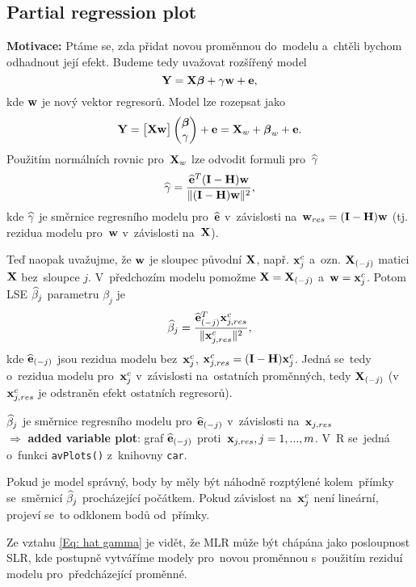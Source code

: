 \subsection{Partial regression plot}
	\textbf{Motivace:} Ptáme se, zda přidat novou proměnnou do~modelu a~chtěli bychom odhadnout její efekt. Budeme tedy uvažovat rozšířený model
	 $$
	\mathbf{Y} = \mathbf{X} \boldsymbol{\beta} + \gamma \mathbf{w} + \mathbf{e},
	 $$
	kde $\mathbf{w}$ je nový vektor regresorů. Model lze rozepsat jako
	 $$
	\mathbf{Y} = \begin{bmatrix}
	\mathbf{X} \mathbf{w}
	\end{bmatrix} \begin{pmatrix}
	\boldsymbol{\beta} \\ \gamma
	\end{pmatrix} + \mathbf{e} = \mathbf{X}_w + \boldsymbol{\beta}_w + \mathbf{e}.
	 $$
	Použitím normálních rovnic pro~$\mathbf{X}_w$ lze odvodit formuli pro~$\widehat{\gamma}$
	\begin{equation}
		\widehat{\gamma} = \frac{\widehat{\mathbf{e}}^T (\textbf{I} - \textbf{H}) \mathbf{w}}{\| (\textbf{I} - \textbf{H})\mathbf{w} \|^2},
		\label{Eq: hat gamma}
	\end{equation}
	kde $\widehat{\gamma}$ je směrnice regresního modelu pro~$\widehat{\mathbf{e}}$ v~závislosti na~$\mathbf{w}_{res} = (\textbf{I} - \textbf{H})\mathbf{w}$ (tj. rezidua modelu pro~$\mathbf{w}$ v~závislosti na~$\mathbf{X}$).
	
	Teď naopak uvažujme, že $\mathbf{w}$ je sloupec původní $\mathbf{X}$, např. $\mathbf{x}_j^c$ a~ozn. $\mathbf{X}_{(-j)}$ matici $\mathbf{X}$ bez~sloupce $j$. V~předchozím modelu pomožme $\mathbf{X} = \mathbf{X}_{(-j)}$ a~$\mathbf{w} = \mathbf{x}_j^c$. Potom  LSE $\widehat{\beta}_j$ parametru $\beta_j$ je
	 $$
	\widehat{\beta}_j = \frac{\widehat{\mathbf{e}}_{(-j)}^T \mathbf{x}_{j, res}^c}{\| \mathbf{x}_{j,res}^c \|^2},
	 $$
	kde $\widehat{\mathbf{e}}_{(-j)}$ jsou rezidua modelu bez~$\mathbf{x}_j^c$, $\mathbf{x}_{j,res}^c = (\textbf{I} - \textbf{H}) \mathbf{x}_j^c$. Jedná se~tedy o~rezidua modelu pro~$\mathbf{x}_j^c$ v~závislosti na~ostatních proměnných, tedy $\mathbf{X}_{(-j)}$ (v $\mathbf{x}_{j,res}^c$ je odstraněn efekt ostatních regresorů).
	
	 $\widehat{\beta}_j$ je směrnice regresního modelu pro~$\widehat{\mathbf{e}}_{(-j)}$ v~závislosti na~$\mathbf{x}_{j, res}$ \\ $\Rightarrow$ \textbf{added variable plot}: graf $\widehat{\mathbf{e}}_{(-j)}$ proti~$\mathbf{x}_{j, res}, j = 1,..., m$. V~R se~jedná o~funkci \verb|avPlots()| z~knihovny \verb|car|.
	
	Pokud je model správný, body by měly být náhodně rozptýlené kolem~přímky se~směrnicí $\widehat{\beta}_j$ procházející počátkem. Pokud závislost na~$\mathbf{x}_j^c$ není lineární, projeví se~to odklonem bodů od~přímky.


\begin{remark}
Ze vztahu \eqref{Eq: hat gamma} je vidět, že MLR může být chápána jako posloupnost SLR, kde postupně vytváříme modely pro~novou proměnnou s~použitím reziduí modelu pro~předcházející proměnné.
\end{remark}


